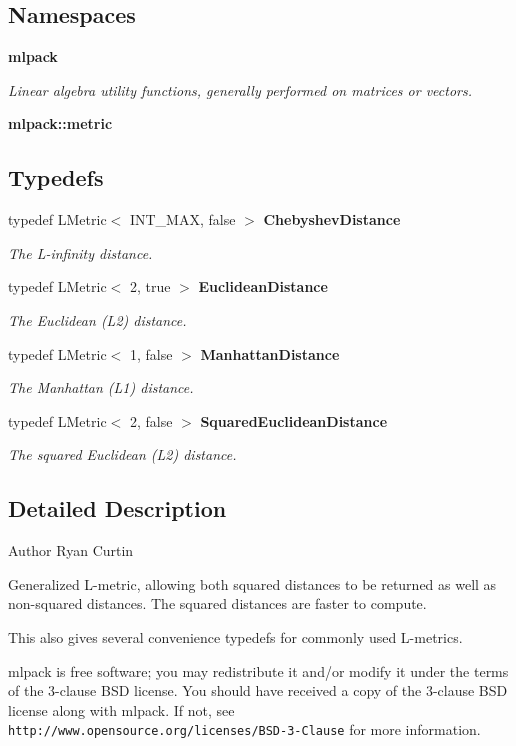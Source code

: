 \subsection*{Namespaces}
\begin{DoxyCompactItemize}
\item 
 \textbf{ mlpack}
\begin{DoxyCompactList}\small\item\em Linear algebra utility functions, generally performed on matrices or vectors. \end{DoxyCompactList}\item 
 \textbf{ mlpack\+::metric}
\end{DoxyCompactItemize}
\subsection*{Typedefs}
\begin{DoxyCompactItemize}
\item 
typedef L\+Metric$<$ I\+N\+T\+\_\+\+M\+AX, false $>$ \textbf{ Chebyshev\+Distance}
\begin{DoxyCompactList}\small\item\em The L-\/infinity distance. \end{DoxyCompactList}\item 
typedef L\+Metric$<$ 2, true $>$ \textbf{ Euclidean\+Distance}
\begin{DoxyCompactList}\small\item\em The Euclidean (L2) distance. \end{DoxyCompactList}\item 
typedef L\+Metric$<$ 1, false $>$ \textbf{ Manhattan\+Distance}
\begin{DoxyCompactList}\small\item\em The Manhattan (L1) distance. \end{DoxyCompactList}\item 
typedef L\+Metric$<$ 2, false $>$ \textbf{ Squared\+Euclidean\+Distance}
\begin{DoxyCompactList}\small\item\em The squared Euclidean (L2) distance. \end{DoxyCompactList}\end{DoxyCompactItemize}


\subsection{Detailed Description}
\begin{DoxyAuthor}{Author}
Ryan Curtin
\end{DoxyAuthor}
Generalized L-\/metric, allowing both squared distances to be returned as well as non-\/squared distances. The squared distances are faster to compute.

This also gives several convenience typedefs for commonly used L-\/metrics.

mlpack is free software; you may redistribute it and/or modify it under the terms of the 3-\/clause B\+SD license. You should have received a copy of the 3-\/clause B\+SD license along with mlpack. If not, see {\tt http\+://www.\+opensource.\+org/licenses/\+B\+S\+D-\/3-\/\+Clause} for more information. 